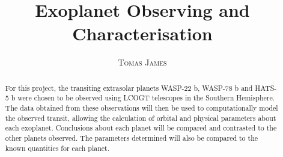 \documentclass[twoside,4pt]{article}
\title{\vspace{-15mm}\fontsize{24pt}{10pt}\selectfont\textbf{Exoplanet Observing and Characterisation}} %
\author{
\large
\textsc{Tomas James} %
\vspace{-5mm}
}
\date{}
\begin{document}
\maketitle %

\thispagestyle{fancy} %


\begin{abstract}
For this project, the transiting extrasolar planets WASP-22 b, WASP-78 b and HATS-5 b were chosen to be observed using LCOGT telescopes in the Southern Hemisphere. The data obtained from these observations will then be used to computationally model the observed transit, allowing the calculation of orbital and physical parameters about each exoplanet. Conclusions about each planet will be compared and contrasted to the other planets observed. The parameters determined will also be compared to the known quantities for each planet.
\end{abstract}

\end{document}
